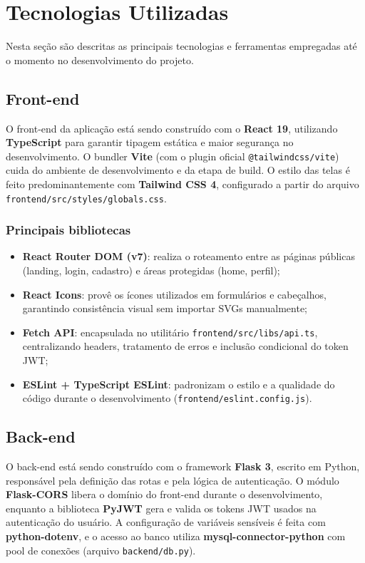 \chapter{Tecnologias Utilizadas}

Nesta seção são descritas as principais tecnologias e ferramentas empregadas até o momento no desenvolvimento do projeto.

\section{Front-end}
O front-end da aplicação está sendo construído com o \textbf{React 19}, utilizando \textbf{TypeScript} para garantir tipagem estática e maior segurança no desenvolvimento. O bundler \textbf{Vite} (com o plugin oficial \texttt{@tailwindcss/vite}) cuida do ambiente de desenvolvimento e da etapa de build. O estilo das telas é feito predominantemente com \textbf{Tailwind CSS 4}, configurado a partir do arquivo \texttt{frontend/src/styles/globals.css}.

\subsection{Principais bibliotecas}
\begin{itemize}
    \item \textbf{React Router DOM (v7)}: realiza o roteamento entre as páginas públicas (landing, login, cadastro) e áreas protegidas (home, perfil);
    \item \textbf{React Icons}: provê os ícones utilizados em formulários e cabeçalhos, garantindo consistência visual sem importar SVGs manualmente;
    \item \textbf{Fetch API}: encapsulada no utilitário \texttt{frontend/src/libs/api.ts}, centralizando headers, tratamento de erros e inclusão condicional do token JWT;
    \item \textbf{ESLint + TypeScript ESLint}: padronizam o estilo e a qualidade do código durante o desenvolvimento (\texttt{frontend/eslint.config.js}).
\end{itemize}

\section{Back-end}
O back-end está sendo construído com o framework \textbf{Flask 3}, escrito em Python, responsável pela definição das rotas e pela lógica de autenticação. O módulo \textbf{Flask-CORS} libera o domínio do front-end durante o desenvolvimento, enquanto a biblioteca \textbf{PyJWT} gera e valida os tokens JWT usados na autenticação do usuário. A configuração de variáveis sensíveis é feita com \textbf{python-dotenv}, e o acesso ao banco utiliza \textbf{mysql-connector-python} com pool de conexões (arquivo \texttt{backend/db.py}).

